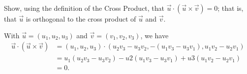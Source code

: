 
\begin{Exercise}[
name={},
title={}, 
difficulty=0,
origin={\cite{GHC}}]
Show, using the definition of the Cross Product, that $\vec u\cdot(\vec u\times\vec v)=0$; that is, that $\vec u$ is orthogonal to the cross product of $\vec u$ and $\vec v$.
\end{Exercise}

\begin{Answer}
With $\vec u = (u_1,u_2,u_3)$ and $\vec v = (v_1,v_2,v_3)$, we have
\begin{align*}
\vec u\cdot(\vec u\times\vec v) &= (u_1,u_2,u_3)\cdot (u_2v_3-u_3v_2,-(u_1v_3-u_3v_1),u_1v_2-u_2v_1) \\
		&= u_1(u_2v_3-u_3v_2) - u2(u_1v_3-u_3v_1)+u3(u_1v_2-u_2v_1)\\
		&=0.
\end{align*}

\end{Answer}
